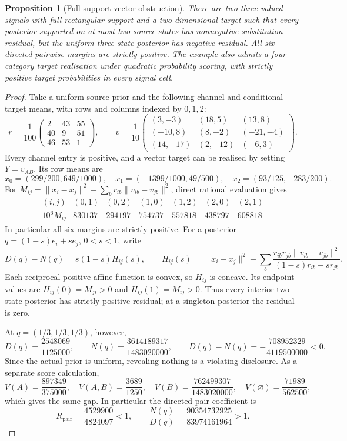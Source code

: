 \documentclass[11pt,a4paper]{article}
\newtheorem{proposition}[theorem]{Proposition}
\begin{document}
\begin{proposition}[Full-support vector obstruction]\label{prop:vector-obstruction}
There are two three-valued signals with full rectangular support and a
two-dimensional target such that every posterior supported on at most two
source states has nonnegative substitution residual, but the uniform
three-state posterior has negative residual. All six directed pairwise
margins are strictly positive. The example also admits a four-category
target realisation under quadratic probability scoring, with strictly
positive target probabilities in every signal cell.
\end{proposition}
\begin{proof}
Take a uniform source prior and the following channel and conditional target
means, with rows and columns indexed by $0,1,2$:
\[
 r=\frac1{100}\begin{pmatrix}2&43&55\\40&9&51\\46&53&1\end{pmatrix},
 \qquad
 v=\frac1{10}\begin{pmatrix}
 (3,-3)&(18,5)&(13,8)\\
 (-10,8)&(8,-2)&(-21,-4)\\
 (14,-17)&(2,-12)&(-6,3)
 \end{pmatrix}.
\]
Every channel entry is positive, and a vector target can be realised by
setting $Y=v_{AB}$. Its row means are
\[
 x_0=(299/200,649/1000),\quad
 x_1=(-1399/1000,49/500),\quad
 x_2=(93/125,-283/200).
\]
For $M_{ij}=\|x_i-x_j\|^2-\sum_b r_{ib}\|v_{ib}-v_{jb}\|^2$,
direct rational evaluation gives
\[
\begin{array}{c|rrrrrr}
(i,j)&(0,1)&(0,2)&(1,0)&(1,2)&(2,0)&(2,1)\\\hline
10^6 M_{ij}&830137&294197&754737&557818&438797&608818
\end{array}
\]
In particular all six margins are strictly positive. For a posterior
$q=(1-s)e_i+se_j$, $0<s<1$, write
\[
 D(q)-N(q)=s(1-s)H_{ij}(s),\qquad
 H_{ij}(s)=\|x_i-x_j\|^2-
 \sum_b\frac{r_{ib}r_{jb}\|v_{ib}-v_{jb}\|^2}
 {(1-s)r_{ib}+sr_{jb}}.
\]
Each reciprocal positive affine function is convex, so $H_{ij}$ is concave.
Its endpoint values are $H_{ij}(0)=M_{ji}>0$ and
$H_{ij}(1)=M_{ij}>0$. Thus every interior two-state posterior has strictly
positive residual; at a singleton posterior the residual is zero.

At $q=(1/3,1/3,1/3)$, however,
\[
 D(q)=\frac{2548069}{1125000},\qquad
 N(q)=\frac{3614189317}{1483020000},\qquad
 D(q)-N(q)=-\frac{708952329}{4119500000}<0.
\]
\pagebreak
Since the actual prior is uniform, revealing nothing is a violating
disclosure. As a separate score calculation,
\[
 V(A)=\frac{897349}{375000},\quad
 V(A,B)=\frac{3689}{1250},\quad
 V(B)=\frac{762499307}{1483020000},\quad
 V(\varnothing)=\frac{71989}{562500},
\]
which gives the same gap. In particular the directed-pair coefficient is
\[
 R_{\mathrm{pair}}=\frac{4529900}{4824097}<1,
 \qquad
 \frac{N(q)}{D(q)}=\frac{90354732925}{83974161964}>1.
\]


\end{proof}
\end{document}
